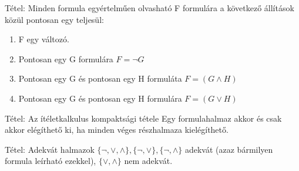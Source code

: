 \documentclass{beamer}
\begin{document}
\begin{frame}[plain]
\end{frame}


\begin{frame}[plain]
\end{frame}


\begin{frame}

\begin{block}{Tétel: Minden formula egyértelműen olvasható}
F formulára a következő állítások közül pontosan egy teljesül:

\begin{enumerate}
\item F egy változó.
\item Pontosan egy G formulára $F = \neg G$
\item Pontosan egy G és pontosan egy H formuláta $F = (G \land H)$
\item Pontosan egy G és pontosan egy H formulára $F = (G \lor H)$
\end{enumerate}

\end{block}

\end{frame}


\begin{frame}

\begin{block}{Tétel: Az ítéletkalkulus kompaktsági tétele}
Egy formulahalmaz akkor és csak akkor elégíthető ki, ha minden véges részhalmaza kielégíthető.

\end{block}

\begin{block}{Tétel: Adekvát halmazok}
$\{\neg, \lor, \land\}, \{\neg, \lor\}, \{\neg, \land\}$ adekvát (azaz bármilyen formula leírható ezekkel), $\{\lor, \land\}$ nem adekvát.

\end{block}

\end{frame}
\end{document}
